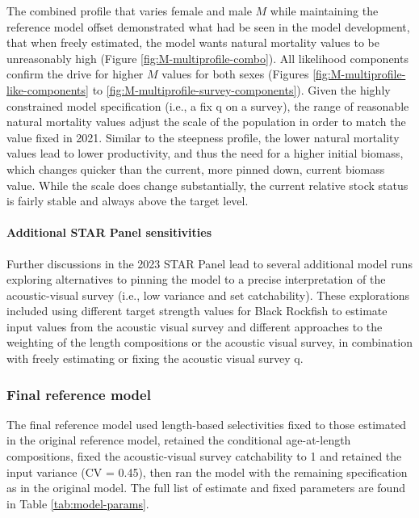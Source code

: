 \documentclass[11pt,
  letterpaper,
]{article}
\begin{document}
The combined profile that varies female and male \(M\) while maintaining the reference model offset demonstrated what had be seen in the model development, that when freely estimated, the model wants natural mortality values to be unreasonably high (Figure \ref{fig:M-multiprofile-combo}). All likelihood components confirm the drive for higher \(M\) values for both sexes (Figures \ref{fig:M-multiprofile-like-components} to \ref{fig:M-multiprofile-survey-components}). Given the highly constrained model specification (i.e., a fix q on a survey), the range of reasonable natural mortality values adjust the scale of the population in order to match the value fixed in 2021. Similar to the steepness profile, the lower natural mortality values lead to lower productivity, and thus the need for a higher initial biomass, which changes quicker than the current, more pinned down, current biomass value. While the scale does change substantially, the current relative stock status is fairly stable and always above the target level.

\hypertarget{additional-star-panel-sensitivities}{%
\paragraph{Additional STAR Panel sensitivities}\label{additional-star-panel-sensitivities}}

Further discussions in the 2023 STAR Panel lead to several additional model runs exploring alternatives to pinning the model to a precise interpretation of the acoustic-visual survey (i.e., low variance and set catchability). These explorations included using different target strength values for Black Rockfish to estimate input values from the acoustic visual survey and different approaches to the weighting of the length compositions or the acoustic visual survey, in combination with freely estimating or fixing the acoustic visual survey q.

\hypertarget{final-reference-model}{%
\subsubsection{Final reference model}\label{final-reference-model}}

The final reference model used length-based selectivities fixed to those estimated in the original reference model, retained the conditional age-at-length compositions, fixed the acoustic-visual survey catchability to 1 and retained the input variance (CV = 0.45), then ran the model with the remaining specification as in the original model. The full list of estimate and fixed parameters are found in Table \ref{tab:model-params}.
\end{document}
